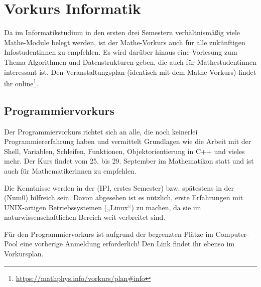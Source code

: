 \section{Vorkurs Informatik}
Da im Informatikstudium in den ersten drei Semestern verhältnismäßig viele Mathe-Module belegt werden, ist der Mathe-Vorkurs auch für alle zukünftigen Infostudentinnen zu empfehlen. Es wird darüber hinaus eine Vorlesung zum Thema Algorithmen und Datenstrukturen geben, die auch für Mathestudentinnen interessant ist. Den Veranstaltungsplan (identisch mit dem Mathe-Vorkurs) findet ihr online\footnote{\label{info-vorkursplan}\url{https://mathphys.info/vorkurs/plan\#info}}.

\subsection{Programmiervorkurs}
Der Programmiervorkurs richtet sich an alle, die noch keinerlei Programmiererfahrung haben und vermittelt Grundlagen wie die Arbeit mit der Shell, Variablen, Schleifen, Funktionen, Objektorientierung in C++ und vieles mehr. Der Kurs findet vom 25. bis 29. September im \gls{Mathematikon} statt und ist auch für Mathematikerinnen zu empfehlen.

Die Kenntnisse werden in der  (\gls{IPI}, erstes Semester) bzw. spätestens in der  (\gls{Num0}) hilfreich sein. Davon abgesehen ist es nützlich, erste Erfahrungen mit UNIX-artigen Betriebssystemen („Linux“) zu machen, da sie im naturwissenschaftlichen Bereich weit verbreitet sind.

Für den Programmiervorkurs ist aufgrund der begrenzten Plätze im Computer-Pool eine vorherige Anmeldung erforderlich! Den Link findet ihr ebenso im Vorkursplan.
